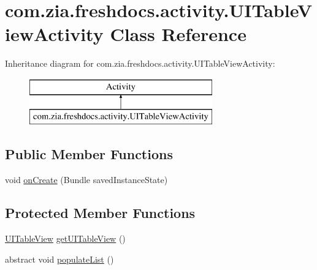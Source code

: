 \hypertarget{classcom_1_1zia_1_1freshdocs_1_1activity_1_1_u_i_table_view_activity}{\section{com.\-zia.\-freshdocs.\-activity.\-U\-I\-Table\-View\-Activity Class Reference}
\label{classcom_1_1zia_1_1freshdocs_1_1activity_1_1_u_i_table_view_activity}
}
Inheritance diagram for com.\-zia.\-freshdocs.\-activity.\-U\-I\-Table\-View\-Activity\-:\begin{figure}[H]
\begin{center}
\leavevmode
\includegraphics[height=2.000000cm]{classcom_1_1zia_1_1freshdocs_1_1activity_1_1_u_i_table_view_activity}
\end{center}
\end{figure}
\subsection*{Public Member Functions}
\begin{DoxyCompactItemize}
\item 
void \hyperlink{classcom_1_1zia_1_1freshdocs_1_1activity_1_1_u_i_table_view_activity_a970660f78510f2118971fd00582a6311}{on\-Create} (Bundle saved\-Instance\-State)
\end{DoxyCompactItemize}
\subsection*{Protected Member Functions}
\begin{DoxyCompactItemize}
\item 
\hyperlink{classcom_1_1zia_1_1freshdocs_1_1widget_1_1_u_i_table_view}{U\-I\-Table\-View} \hyperlink{classcom_1_1zia_1_1freshdocs_1_1activity_1_1_u_i_table_view_activity_ae5a6d0fecc43f257ef8005cfd81e50e3}{get\-U\-I\-Table\-View} ()
\item 
abstract void \hyperlink{classcom_1_1zia_1_1freshdocs_1_1activity_1_1_u_i_table_view_activity_a2df1ff1b76b2b9acef82d8fa9376aae5}{populate\-List} ()
\end{DoxyCompactItemize}


